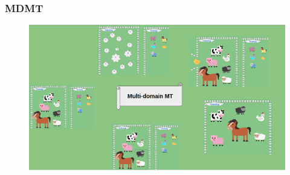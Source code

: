 \documentclass{beamer}
\begin{document}
\begin{frame}
\frametitle{MDMT}
\begin{figure}
\includegraphics[width=\textwidth]{MDMT_question.png}
\end{figure}
\end{frame}
\end{document}
